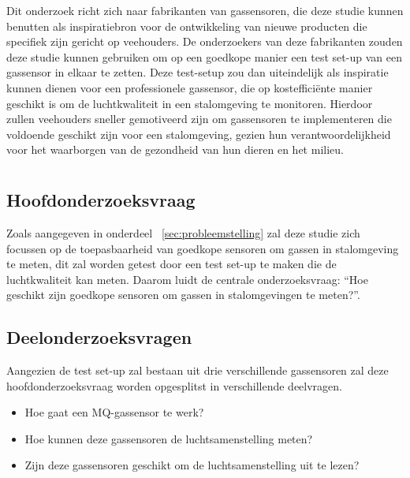 Dit onderzoek richt zich naar fabrikanten van gassensoren, die deze studie kunnen benutten als inspiratiebron voor de ontwikkeling van nieuwe producten die specifiek zijn gericht op veehouders. De onderzoekers van deze fabrikanten zouden deze studie kunnen gebruiken om op een goedkope manier een test set-up van een gassensor in elkaar te zetten. Deze test-setup zou dan uiteindelijk als inspiratie kunnen dienen voor een professionele gassensor, die op kostefficiënte manier geschikt is om de luchtkwaliteit in een stalomgeving te monitoren. Hierdoor zullen veehouders sneller gemotiveerd zijn om gassensoren te implementeren die voldoende geschikt zijn voor een stalomgeving, gezien hun verantwoordelijkheid voor het waarborgen van de gezondheid van hun dieren en het milieu.



\section{}%
\label{sec:onderzoeksvraag}

\subsection{Hoofdonderzoeksvraag}%
Zoals aangegeven in onderdeel ~\ref{sec:probleemstelling} zal deze studie zich focussen op de toepasbaarheid van goedkope sensoren om gassen in stalomgeving te meten, dit zal worden getest door een test set-up te maken die de luchtkwaliteit kan meten. Daarom luidt de centrale onderzoeksvraag: ``Hoe geschikt zijn goedkope sensoren om gassen in stalomgevingen te meten?''.

\subsection{Deelonderzoeksvragen}%
Aangezien de test set-up zal bestaan uit drie verschillende gassensoren zal deze hoofdonderzoeksvraag worden opgesplitst in verschillende deelvragen.

\begin{itemize}
    \item Hoe gaat een MQ-gassensor te werk?
    \item Hoe kunnen deze gassensoren de luchtsamenstelling meten?
    \item Zijn deze gassensoren geschikt om de luchtsamenstelling uit te lezen?
\end{itemize}


